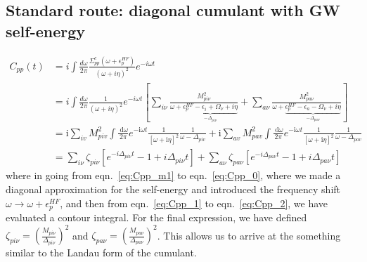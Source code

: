 \subsection{Standard route: diagonal cumulant with GW self-energy}
\begin{align}
	 C_{pp}(t) &= i \int \frac{d\omega}{2\pi} \frac{ \Sigma_{pp}^c\left(\omega+\epsilon_p^{HF}\right)}{(\omega + i \eta)^2} e^{-i \omega t}
\label{eq:Cpp_0} \\
&= i \int \frac{d\omega}{2\pi} \frac{1}{(\omega + i \eta)^2} e^{-i \omega t} \left[ \sum_{i\nu} \frac{M_{pi\nu}^2}{\omega + \underbrace{\epsilon_p^{HF} - \epsilon_i + \Omega_\nu + i \eta}_{-\Delta_{pi\nu}}} + \sum_{a\nu} \frac{M_{pa\nu}^2}{\omega + \underbrace{\epsilon_p^{HF} - \epsilon_a - \Omega_\nu + i \eta}_{-\Delta_{pa\nu}}} \right] \\
& =\mathrm{i} \sum_{i v} M_{p i v}^2 \int \frac{\mathrm{~d} \omega}{2 \pi} e^{-\mathrm{i} \omega t} \frac{1}{[\omega+\mathrm{i} \eta]^2} \frac{1}{\omega-\Delta_{p i v}} +\mathrm{i} \sum_{a v} M_{p a v}^2 \int \frac{\mathrm{~d} \omega}{2 \pi} e^{-\mathrm{i} \omega t} \frac{1}{[\omega+\mathrm{i} \eta]^2} \frac{1}{\omega-\Delta_{p a v}}
\label{eq:Cpp_1}
\\
&= \sum_{i\nu} \zeta_{pi\nu} \left[ e^{-i\Delta_{pi\nu} t} - 1 + i\Delta_{pi\nu} t \right] + \sum_{a\nu} \zeta_{pa\nu} \left[ e^{-i\Delta_{pa\nu} t} - 1 + i\Delta_{pa\nu} t \right]
\label{eq:Cpp_2}
\end{align}
where in going from eqn.~\ref{eq:Cpp_m1} to eqn.~\ref{eq:Cpp_0}, where we made a diagonal approximation for the self-energy and introduced the frequency shift $\omega \to \omega + \epsilon_p^{HF}$, and then from eqn.~\ref{eq:Cpp_1} to eqn.~\ref{eq:Cpp_2}, we have evaluated a contour integral. For the final expression, we have defined $\zeta_{pi\nu} = \left(\frac{M_{pi\nu}}{\Delta_{pi\nu}}\right)^2$ and $\zeta_{pa\nu} = \left(\frac{M_{pa\nu}}{\Delta_{pa\nu}}\right)^2$. This allows us to arrive at the something similar to the Landau form of the cumulant.
